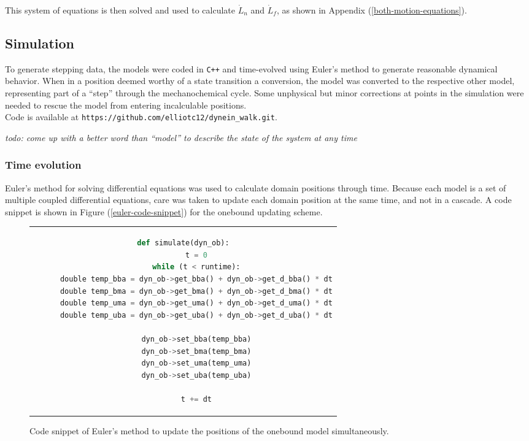 \documentclass[10pt]{article} %
\begin{document}
This system of equations is then solved and used to calculate $\dot{L}_n$ and $\dot{L}_f$, as shown in Appendix (\ref{both-motion-equations}).

\subsection{Simulation}
To generate stepping data, the models were coded in \verb|C++| and time-evolved using Euler's method to generate reasonable dynamical behavior. When in a position deemed worthy of a state transition a conversion, the model was converted to the respective other model, representing part of a ``step'' through the mechanochemical cycle. Some unphysical but minor corrections at points in the simulation were needed to rescue the model from entering incalculable positions.\\

Code is available at \verb|https://github.com/elliotc12/dynein_walk.git|.

\textit{todo: come up with a better word than ``model'' to describe the state of the system at any time}
\subsubsection{Time evolution}
Euler's method for solving differential equations was used to calculate domain positions through time. Because each model is a set of multiple coupled differential equations, care was taken to update each domain position at the same time, and not in a cascade. A code snippet is shown in Figure (\ref{euler-code-snippet}) for the onebound updating scheme.

\begin{figure}[h!]
  \centering
  \begin{tabular}{c}
    \begin{lstlisting}[language=python]
      def simulate(dyn_ob):
      t = 0
      while (t < runtime):
      double temp_bba = dyn_ob->get_bba() + dyn_ob->get_d_bba() * dt
      double temp_bma = dyn_ob->get_bma() + dyn_ob->get_d_bma() * dt
      double temp_uma = dyn_ob->get_uma() + dyn_ob->get_d_uma() * dt
      double temp_uba = dyn_ob->get_uba() + dyn_ob->get_d_uba() * dt

      dyn_ob->set_bba(temp_bba)
      dyn_ob->set_bma(temp_bma)
      dyn_ob->set_uma(temp_uma)
      dyn_ob->set_uba(temp_uba)

      t += dt
    \end{lstlisting}
  \end{tabular}
  \caption{Code snippet of Euler's method to update the positions of the onebound model simultaneously.}
  \label{ob_struct}
\end{figure}
\end{document}
